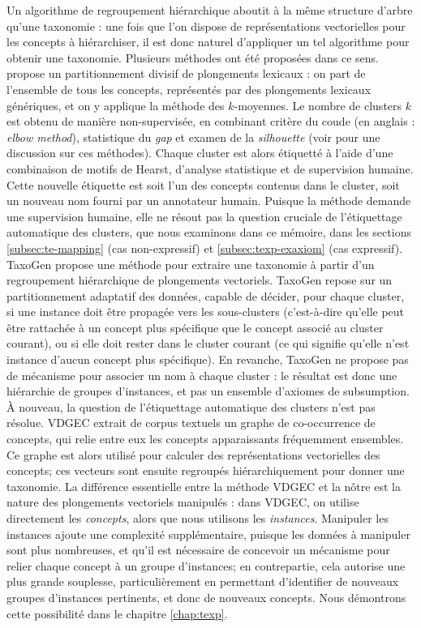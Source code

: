 Un algorithme de regroupement hiérarchique aboutit à la même structure d'arbre qu'une taxonomie : une fois que l'on dispose de représentations vectorielles pour les concepts à hiérarchiser, il est donc naturel d'appliquer un tel algorithme pour obtenir une taxonomie. Plusieurs méthodes ont été proposées dans ce sens. \cite{gupta2016domain} propose un partitionnement divisif de plongements lexicaux : on part de l'ensemble de tous les concepts, représentés par des plongements lexicaux génériques, et on y applique la méthode des $k$-moyennes. Le nombre de clusters $k$ est obtenu de manière non-supervisée, en combinant 
critère du coude (en anglais : \textit{elbow method}), statistique du \textit{gap} et examen de la \textit{silhouette} (voir \cite[p.~126--130]{everitt2011cluster} pour une discussion sur ces méthodes). Chaque cluster est alors étiquetté à l'aide d'une combinaison de motifs de Hearst, d'analyse statistique et de supervision humaine. Cette nouvelle étiquette est soit l'un des concepts contenus dans le cluster, soit un nouveau nom fourni par un annotateur humain. Puisque la méthode demande une supervision humaine, elle ne résout pas la question cruciale de l'étiquettage automatique des clusters, que nous examinons dans ce mémoire, dans les sections \ref{subsec:te-mapping} (cas non-expressif) et \ref{subsec:texp-exaxiom} (cas expressif). TaxoGen \cite{zhang2018taxogen} propose une méthode pour extraire une taxonomie à partir d'un regroupement hiérarchique de plongements vectoriels. TaxoGen repose sur un partitionnement adaptatif des données, capable de décider, pour chaque cluster, si une instance doit être propagée vers les sous-clusters (c'est-à-dire qu'elle peut être rattachée à un concept plus spécifique que le concept associé au cluster courant), ou si elle doit rester dans le cluster courant (ce qui signifie qu'elle n'est instance d'aucun concept plus spécifique). En revanche, TaxoGen ne propose pas de mécanisme pour associer un nom à chaque cluster : le résultat est donc une hiérarchie de groupes d'instances, et pas un ensemble d'axiomes de subsumption. À nouveau, la question de l'étiquettage automatique des clusters n'est pas résolue.
VDGEC \cite{zhang2018variational2} extrait de corpus textuels un graphe de co-occurrence de concepts, qui relie entre eux les concepts apparaissants fréquemment ensembles. Ce graphe est alors utilisé pour calculer des représentations vectorielles des concepts; ces vecteurs sont ensuite regroupés hiérarchiquement pour donner une taxonomie. La différence essentielle entre la méthode VDGEC et la nôtre est la nature des plongements vectoriels manipulés : dans VDGEC, on utilise directement les \textit{concepts}, alors que nous utilisons les \textit{instances}. Manipuler les instances ajoute une complexité supplémentaire, puisque les données à manipuler sont plus nombreuses, et qu'il est nécessaire de concevoir un mécanisme pour relier chaque concept à un groupe d'instances; en contrepartie, cela autorise une plus grande souplesse, particulièrement en permettant d'identifier de nouveaux groupes d'instances pertinents, et donc de nouveaux concepts. Nous démontrons cette possibilité dans le chapitre \ref{chap:texp}.

